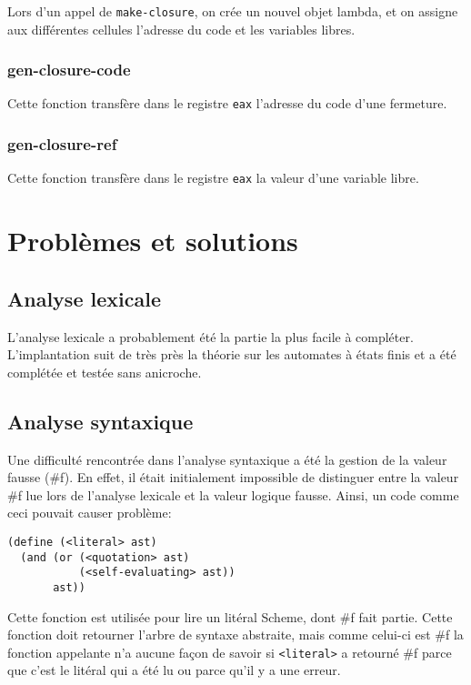 \documentclass[10pt]{report}
\begin{document}
Lors d'un appel de {\tt make-closure}, on crée un nouvel objet lambda,
et on assigne aux différentes cellules l'adresse du code et les
variables libres.


\subsection{gen-closure-code}

Cette fonction transfère dans le registre {\tt eax} l'adresse du code
d'une fermeture.


\subsection{gen-closure-ref}

Cette fonction transfère dans le registre {\tt eax} la valeur d'une
variable libre.



\chapter{Problèmes et solutions}

\section{Analyse lexicale}

L'analyse lexicale a probablement été la partie la plus facile à
compléter. L'implantation suit de très près la théorie sur les
automates à états finis et a été complétée et testée sans anicroche.

\section{Analyse syntaxique}

Une difficulté rencontrée dans l'analyse syntaxique a été la gestion
de la valeur fausse (\#f).  En effet, il était initialement impossible
de distinguer entre la valeur \#f lue lors de l'analyse lexicale et la
valeur logique fausse.  Ainsi, un code comme ceci pouvait causer
problème:


\begin{verbatim}
(define (<literal> ast)
  (and (or (<quotation> ast)
           (<self-evaluating> ast))
       ast))
\end{verbatim}

Cette fonction est utilisée pour lire un litéral Scheme, dont \#f fait
partie.  Cette fonction doit retourner l'arbre de syntaxe abstraite,
mais comme celui-ci est \#f la fonction appelante n'a aucune façon de
savoir si {\tt <literal>} a retourné \#f parce que c'est le litéral
qui a été lu ou parce qu'il y a une erreur.
\end{document}
